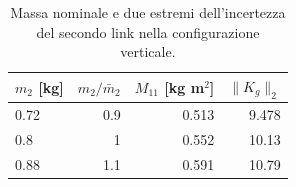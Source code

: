 \begin{table}[htbp]\centering\small
\setlength{\tabcolsep}{4pt}
\begin{tabular}{lrrr}\toprule
$m_2$ [kg] & $m_2/\bar m_2$ & $M_{11}$ [kg m$^2$] & $\|K_g\|_2$\\\midrule
\num{0.72} & \num{0.9} & \num{0.513} & \num{9.478}\\
\num{0.8} & \num{1} & \num{0.552} & \num{10.13}\\
\num{0.88} & \num{1.1} & \num{0.591} & \num{10.79}\\
\bottomrule\end{tabular}
\caption{Massa nominale e due estremi dell'incertezza del secondo link nella configurazione verticale.}
\label{tab:carico}
\end{table}
